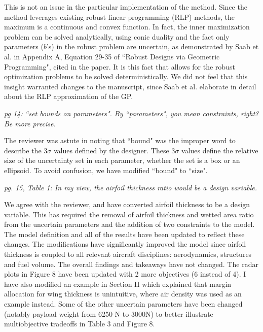 \documentclass[11pt]{article}
\begin{document}
    This is not an issue in the particular implementation of the method.
    Since the method leverages existing robust linear programming (RLP)
    methods, the maximum is a continuous and convex function.
    In fact, the inner maximization problem can be solved analytically, using conic
    duality and the fact only parameters ($b$'s) in the robust problem are uncertain,
    as demonstrated by Saab et al. in Appendix A, Equation 29-35 of ``Robust Designs via Geometric Programming",
    cited in the paper.
    It is this fact that allows for the robust optimization problems to be solved deterministically.
    We did not feel that this insight warranted changes to the manuscript, since
    Saab et al. elaborate in detail about the RLP approximation of the GP.
    \bigskip

    \textit{pg 14: ``set bounds on parameters". By ``parameters", you mean constraints, right? Be more precise.}

    The reviewer was astute in noting that ``bound" was the improper word to describe the $3\sigma$ values
    defined by the designer. These $3\sigma$ values define the relative size
    of the uncertainty set in each parameter, whether the set is a box or an ellipsoid.
    To avoid confusion, we have modified ``bound" to ``size".
    \bigskip

    \textit{pg. 15, Table 1: In my view, the airfoil thickness ratio would be a design variable.}

    We agree with the reviewer, and have converted airfoil thickness to be a design variable.
    This has required the removal of airfoil thickness and wetted area ratio from the uncertain parameters
    and the addition of two constraints to the model. The model definition and all of the results
    have been updated to reflect these changes.
    The modifications have significantly improved the model since
    airfoil thickness is coupled to all relevant aircraft disciplines: aerodynamics, structures and
    fuel volume. The overall findings and takeaways have not changed. The radar plots 
    in Figure 8 have been updated with 2 more objectives (6 instead of 4). I have also
    modified an example in Section II
    which explained that margin allocation for wing thickness
    is unintuitive, where air density was used as an example instead.
    Some of the other uncertain parameters have been changed (notably
    payload weight from 6250 N to 3000N) to better illustrate multiobjective
    tradeoffs in Table 3 and Figure 8. 
    \bigskip
\end{document}
